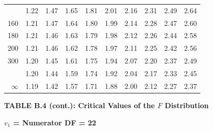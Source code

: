 \documentclass[10pt]{article}
\begin{document}
\begin{longtable}{@{}r!{\vrule width 0.8pt\hspace{0.55em}}rrrrrrrrr@{}}
 & 1.22 & 1.47 & 1.65 & 1.81 & 2.01 & 2.16 & 2.31 & 2.49 & 2.64 \\
160 & 1.21 & 1.47 & 1.64 & 1.80 & 1.99 & 2.14 & 2.28 & 2.47 & 2.60 \\
180 & 1.21 & 1.46 & 1.63 & 1.79 & 1.98 & 2.12 & 2.26 & 2.44 & 2.58 \\
200 & 1.21 & 1.46 & 1.62 & 1.78 & 1.97 & 2.11 & 2.25 & 2.42 & 2.56 \\
300 & 1.20 & 1.45 & 1.61 & 1.75 & 1.94 & 2.07 & 2.20 & 2.37 & 2.49 \\
 & 1.20 & 1.44 & 1.59 & 1.74 & 1.92 & 2.04 & 2.17 & 2.33 & 2.45 \\
$\infty$ & 1.19 & 1.42 & 1.57 & 1.71 & 1.88 & 2.00 & 2.12 & 2.27 & 2.37 \\
\end{longtable}
\newpage
\thispagestyle{empty}
\begin{center}
{\large\bfseries TABLE B.4 (cont.): Critical Values of the $F$ Distribution\par}
\end{center}
{\large\bfseries $v_1$ = Numerator DF = 22\par}
\vspace{0.5em}
\small
\end{document}
